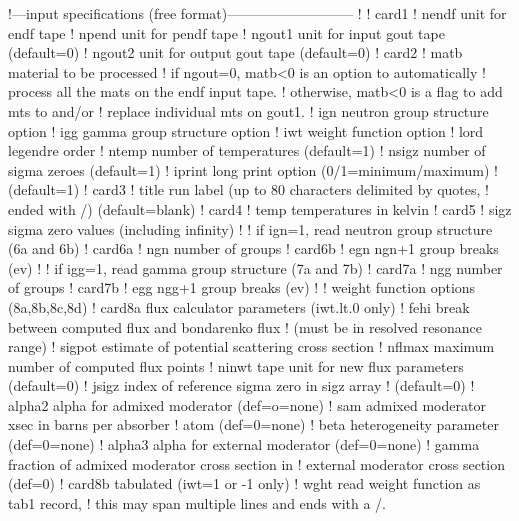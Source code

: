 \small
\begin{ccode}

   !---input specifications (free format)---------------------------
   !
   ! card1
   !    nendf   unit for endf tape
   !    npend   unit for pendf tape
   !    ngout1  unit for input gout tape (default=0)
   !    ngout2  unit for output gout tape (default=0)
   ! card2
   !    matb    material to be processed
   !             if ngout=0, matb<0 is an option to automatically
   !              process all the mats on the endf input tape.
   !             otherwise, matb<0 is a flag to add mts to and/or
   !              replace individual mts on gout1.
   !    ign     neutron group structure option
   !    igg     gamma group structure option
   !    iwt     weight function option
   !    lord    legendre order
   !    ntemp   number of temperatures (default=1)
   !    nsigz   number of sigma zeroes (default=1)
   !    iprint  long print option (0/1=minimum/maximum)
   !            (default=1)
   ! card3
   !    title   run label (up to 80 characters delimited by quotes,
   !            ended with /)  (default=blank)
   ! card4
   !    temp    temperatures in kelvin
   ! card5
   !    sigz    sigma zero values (including infinity)
   !
   !          if ign=1, read neutron group structure (6a and 6b)
   ! card6a
   !    ngn     number of groups
   ! card6b
   !    egn     ngn+1 group breaks (ev)
   !
   !          if igg=1, read gamma group structure (7a and 7b)
   ! card7a
   !    ngg     number of groups
   ! card7b
   !    egg     ngg+1 group breaks (ev)
   !
   !          weight function options (8a,8b,8c,8d)
   ! card8a     flux calculator parameters (iwt.lt.0 only)
   !    fehi    break between computed flux and bondarenko flux
   !            (must be in resolved resonance range)
   !    sigpot  estimate of potential scattering cross section
   !    nflmax  maximum number of computed flux points
   !    ninwt   tape unit for new flux parameters (default=0)
   !    jsigz   index of reference sigma zero in sigz array
   !            (default=0)
   !    alpha2   alpha for admixed moderator (def=o=none)
   !    sam      admixed moderator xsec in barns per absorber
   !             atom (def=0=none)
   !    beta     heterogeneity parameter (def=0=none)
   !    alpha3   alpha for external moderator (def=0=none)
   !    gamma    fraction of admixed moderator cross section in
   !              external moderator cross section (def=0)
   ! card8b     tabulated (iwt=1 or -1 only)
   !    wght    read weight function as tab1 record,
   !            this may span multiple lines and ends with a /.

\end{ccode}
